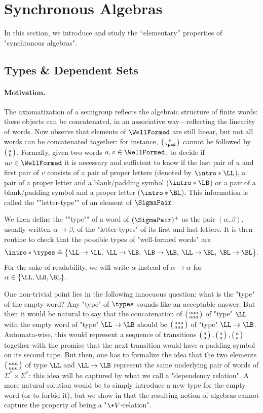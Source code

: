 \section{Synchronous Algebras}
\AP\label{sec:synchronous-algebras}

In this section, we introduce and study the ``elementary'' properties of "synchronous algebras".

\subsection{Types \& Dependent Sets}

\paragraph*{Motivation.} The axiomatization of a semigroup reflects the algebraic structure of
finite words: these objects can be concatenated, in an associative way---reflecting the linearity of 
words. Now observe that elements of $\WellFormed$ are still linear, but
not all words can be concatenated together: for instance, $\pair{a}{\pad}$
cannot be followed by $\pair{a}{b}$.
Formally, given two words $u, v \in \WellFormed$, to decide if $uv \in \WellFormed$
it is necessary and sufficient to know if the last pair of $u$ and first pair of $v$
consists of a pair of proper letters (denoted by \AP$\intro*\LL$), a pair of a proper letter and a blank/padding symbol (\AP$\intro*\LB$) or a pair of a blank/padding symbol and a proper letter (\AP$\intro*\BL$). This information is called the \AP""letter-type"" of an element of $\SigmaPair$.

We then define the \AP""type"" of a word of $(\SigmaPair)^+$ as the pair $(\alpha, \beta)$,
usually written $\alpha \to \beta$, of the "letter-types" of its first and last letters.
It is then routine to check that the possible types of "well-formed words" are
\[
	\intro*\types \defeq \big\{
		\LL\to\LL,\; \LL\to\LB,\; \LB\to\LB,\; \LL\to\BL,\; \BL\to\BL
	\big\}.
\]
For the sake of readability, we will write $\alpha$ instead of $\alpha \to \alpha$
for $\alpha \in \{\LL, \LB, \BL\}$.

One non-trivial point lies in the following innocuous question: what is the "type" of the empty word? Any "type" of $\types$ sounds like an acceptable answer. But then
it would be natural to say that the concatenation of $\pair{aaa}{aaa}$ of "type" $\LL$ with the empty word of "type" $\LL\to\LB$ should be $\pair{aaa}{aaa}$ of "type" $\LL\to\LB$. Automata-wise,
this would represent a sequence of transitions $\pair{a}{a}, \pair{a}{a}, \pair{a}{a}$ together with
the promise that the next transition would have a padding symbol on its second tape. But then, 
one has to formalize the idea that the two elements $\pair{aaa}{aaa}$ of type $\LL$ and $\LL\to\LB$
represent the same underlying pair of words of $\Sigma^*\times\Sigma^*$: this idea will be captured by what we call a "dependency relation". A more natural solution would be to simply introduce a
new type for the empty word (or to forbid it), but we show in  that
the resulting notion of algebras cannot capture the property of being a "$\+V$-relation".

